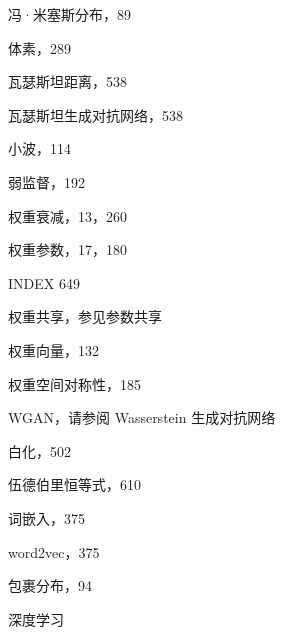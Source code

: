 \documentclass[10pt]{report}
\begin{document}
冯·米塞斯分布，89

体素，289

瓦瑟斯坦距离，538

瓦瑟斯坦生成对抗网络，538

小波，114

弱监督，192

权重衰减，13，260

权重参数，17，180

INDEX 649

权重共享，参见参数共享

权重向量，132

权重空间对称性，185

WGAN，请参阅 Wasserstein 生成对抗网络

白化，502

伍德伯里恒等式，610

词嵌入，375

word2vec，375

包裹分布，94

深度学习
\end{document}
